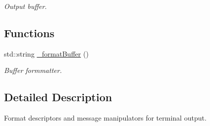 \begin{CompactItemize}
\begin{CompactList}\small\item\em Output buffer. \item\end{CompactList}\end{CompactItemize}
\subsection*{Functions}
\begin{CompactItemize}
\item 
\hypertarget{namespaceServices_1_1Messaging_1af722b9d236a89f406ab61aea91fadb}{
std::string \hyperlink{namespaceServices_1_1Messaging_1af722b9d236a89f406ab61aea91fadb}{\_\-format\-Buffer} ()}
\label{namespaceServices_1_1Messaging_1af722b9d236a89f406ab61aea91fadb}

\begin{CompactList}\small\item\em Buffer formmatter. \item\end{CompactList}\end{CompactItemize}


\subsection{Detailed Description}
Format descriptors and message manipulators for terminal output. 